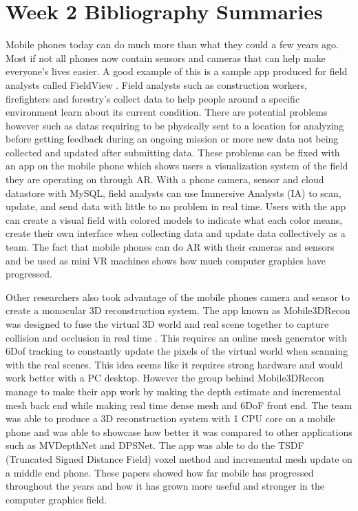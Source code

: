 \documentclass{article}
\begin{document}
\section{Week 2 Bibliography Summaries}

Mobile phones today can do much more than what they could a few years ago. Most if not all phones now contain sensors and cameras that can help make everyone's lives easier. A good example of this is a sample app produced for field analysts called FieldView \cite{8805467}. Field analysts such as construction workers, firefighters and forestry's collect data to help people around a specific environment learn about its current condition. There are potential problems however such as datas requiring to be physically sent to a location for analyzing before getting feedback during an ongoing mission or more new data not being collected and updated after submitting data. These problems can be fixed with an app on the mobile phone which shows users a visualization system of the field they are operating on through AR. With a phone camera, sensor and cloud datastore with MySQL, field analysts can use Immersive Analysts (IA) to scan, update, and send data with little to no problem in real time. Users with the app can create a visual field with colored models to indicate what each color means, create their own interface when collecting data and update data collectively as a team. The fact that mobile phones can do AR with their cameras and sensors and be used as mini VR machines shows how much computer graphics have progressed.

Other researchers also took advantage of the mobile phones camera and sensor to create a monocular 3D reconstruction system. The app known as Mobile3DRecon was designed to fuse the virtual 3D world and real scene together to capture collision and occlusion in real time \cite{9201064}. This requires an online mesh generator with 6Dof tracking to constantly update the pixels of the virtual world when scanning with the real scenes. This idea seems like it requires strong hardware and would work better with a PC desktop. However the group behind Mobile3DRecon manage to make their app work by making the depth estimate and incremental mesh back end while making real time dense mesh and 6DoF front end. The team was able to produce a 3D reconstruction system with 1 CPU core on a mobile phone and was able to showcase how better it was compared to other applications such as MVDepthNet and DPSNet. The app was able to do the TSDF (Truncated Signed Distance Field) voxel method and incremental mesh update on a middle end phone. These papers showed how far mobile has progressed throughout the years and how it has grown more useful and stronger in the computer graphics field.  
\end{document}
